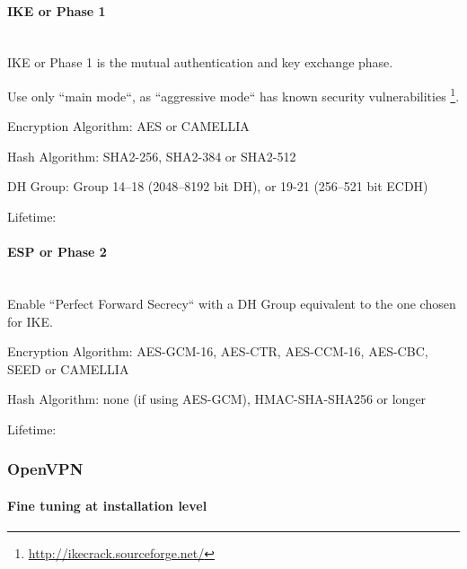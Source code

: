 
\paragraph*{IKE or Phase 1}\mbox{}\\

IKE or Phase 1 is the mutual authentication and key exchange phase.

Use only ``main mode``, as ``aggressive mode`` has known security
vulnerabilities \footnote{\url{http://ikecrack.sourceforge.net/}}.

Encryption Algorithm: AES or CAMELLIA

Hash Algorithm: SHA2-256, SHA2-384 or SHA2-512

DH Group: Group 14--18 (2048--8192 bit DH), or 19-21 (256--521 bit
ECDH)

Lifetime: 


\paragraph*{ESP or Phase 2}\mbox{}\\

Enable ``Perfect Forward Secrecy`` with a DH Group equivalent to the
one chosen for IKE.

Encryption Algorithm: AES-GCM-16, AES-CTR, AES-CCM-16, AES-CBC, SEED
or CAMELLIA 

Hash Algorithm: none (if using AES-GCM), HMAC-SHA-SHA256 or longer

Lifetime: 


\subsubsection{OpenVPN}

\paragraph{Fine tuning at installation level}

